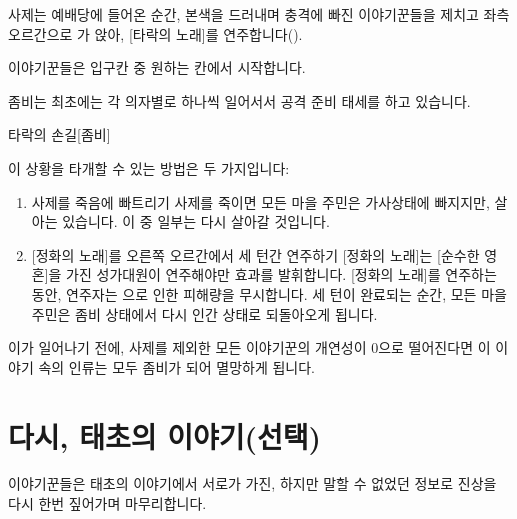 \documentclass{report}
\begin{document}
		사제는 예배당에 들어온 순간, 본색을 드러내며 충격에 빠진 이야기꾼들을 제치고 좌측 오르간으로 가 앉아, [타락의 노래]를 연주합니다().
		
		이야기꾼들은 입구칸 중 원하는 칸에서 시작합니다.
		
		좀비는 최초에는 각 의자별로 하나씩 일어서서 공격 준비 태세를 하고 있습니다.
		
		\begin{spoiler}{타락의 손길}{[좀비]}
			
			
		\end{spoiler}
		
		이 상황을 타개할 수 있는 방법은 두 가지입니다:
		\begin{enumerate}
			\item 사제를 죽음에 빠트리기
				\subitem{$\rightarrow$} 사제를 죽이면 모든 마을 주민은 가사상태에 빠지지만, 살아는 있습니다. 이 중 일부는 다시 살아갈 것입니다.
			\item{} [정화의 노래]를 오른쪽 오르간에서 세 턴간 연주하기
				\subitem{$\rightarrow$} [정화의 노래]는 [순수한 영혼]을 가진 성가대원이 연주해야만 효과를 발휘합니다. [정화의 노래]를 연주하는 동안, 연주자는 으로 인한 피해량을 무시합니다. 세 턴이 완료되는 순간, 모든 마을 주민은 좀비 상태에서 다시 인간 상태로 되돌아오게 됩니다.
		\end{enumerate}
		
		이가 일어나기 전에, 사제를 제외한 모든 이야기꾼의 개연성이 0으로 떨어진다면 이 이야기 속의 인류는 모두 좀비가 되어 멸망하게 됩니다.
	
	\section{다시, 태초의 이야기(선택)}
		이야기꾼들은 태초의 이야기에서 서로가 가진, 하지만 말할 수 없었던 정보로 진상을 다시 한번 짚어가며 마무리합니다.
	
\end{document}
